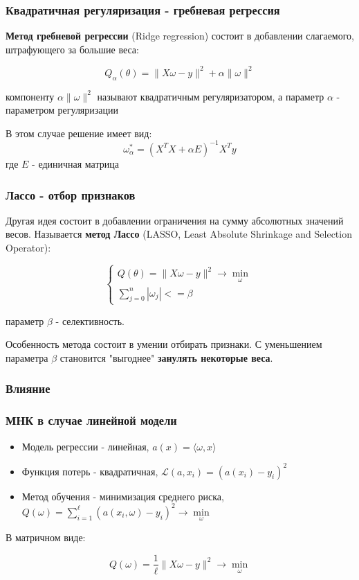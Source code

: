 \documentclass{beamer}
\begin{document}
	\begin{frame}
		\frametitle{Квадратичная регуляризация - гребневая регрессия}
		\textbf{Метод гребневой регрессии} (Ridge regression) состоит в добавлении слагаемого, штрафующего за большие веса:
		
		$$Q_{\alpha}(\theta) = \|X\omega - y\|^{2} + \alpha \|\omega\|^{2}$$
		
		компоненту $\alpha \|\omega\|^{2}$ называют квадратичным регуляризатором, а параметр $\alpha$ - параметром регуляризации
		
		\vspace{15pt}
		
		В этом случае решение имеет вид:
		$$
		\omega_{\alpha}^{*} = (X^{T}X + \alpha E)^{-1} X^{T} y
		$$
		где $E$ - единичная матрица
	\end{frame}
	
	\begin{frame}
		\frametitle{Лассо - отбор признаков}
		Другая идея состоит в добавлении ограничения на сумму абсолютных значений весов. Называется \textbf{метод Лассо} (LASSO, Least Absolute Shrinkage and Selection Operator):
		
		\[
			\begin{cases}
				Q(\theta) = \|X\omega - y\|^{2} \rightarrow \min_{\omega}
				\\
				\sum_{j=0}^{n}|\omega_{j}| <= \beta
			\end{cases}
		\]
		
		параметр $\beta$ - селективность.
		
		\vspace{15pt}
		
		Особенность метода состоит в умении отбирать признаки. С уменьшением параметра $\beta$ становится "выгоднее" \textbf{занулять некоторые веса}.
	\end{frame}
	
	
	\begin{frame}
		\frametitle{Влияние }
	\end{frame}
	
	
	\begin{frame}
		\frametitle{МНК в случае линейной модели}
		
		\begin{itemize}
			\item Модель регрессии - линейная, $a(x) = \langle \omega, x \rangle$
			\item Функция потерь - квадратичная, $\mathcal{L}(a, x_i) = (a(x_i) - y_i)^{2}$
			\item Метод обучения - минимизация среднего риска, 
			$Q(\omega) = \sum_{i=1}^{\ell} (a(x_i, \omega) - y_i)^{2} \to \min\limits_{\omega}$
		\end{itemize}
	
		\vspace{15pt}
		
		В матричном виде:
		
		$$
		Q(\omega) = \frac{1}{\ell} \|X\omega - y\|^{2} \to \min_{\omega}
		$$
	\end{frame}
\end{document}
